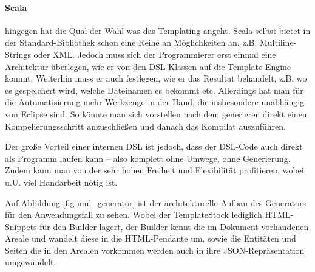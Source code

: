 \paragraph{Scala} hingegen hat die Qual der Wahl was das Templating angeht.
Scala selbst bietet in der Standard-Bibliothek schon
eine Reihe an Möglichkeiten an,
z.B. Multiline-Strings oder XML. Jedoch muss sich der Programmierer erst einmal
eine Architektur überlegen, wie er von den DSL-Klassen auf die Template-Engine
kommt. Weiterhin muss er auch festlegen, wie er das Resultat behandelt,
z.B. wo es gespeichert wird, welche Dateinamen es bekommt etc.
Allerdings hat man für die Automatisierung mehr Werkzeuge in der Hand,
die insbesondere unabhängig von Eclipse sind. So könnte man sich vorstellen
nach dem generieren direkt einen Kompelierungsschritt anzuschließen und
danach das Kompilat auszuführen.

Der große Vorteil einer internen DSL ist jedoch, dass der DSL-Code auch
direkt als Programm laufen kann -- also komplett ohne Umwege, ohne Generierung.
Zudem kann man von der sehr hohen Freiheit und Flexibilität profitieren,
wobei u.U. viel Handarbeit nötig ist.

Auf Abbildung \ref{fig-uml_generator} ist der architekturelle Aufbau
des Generators für den Anwendungsfall zu sehen. Wobei der TemplateStock
lediglich HTML-Snippets für den Builder lagert, der Builder
kennt die im Dokument vorhandenen Areale und wandelt diese in die HTML-Pendante
um, sowie die Entitäten und Seiten die in den Arealen vorkommen werden auch
in ihre JSON-Repräsentation umgewandelt.

